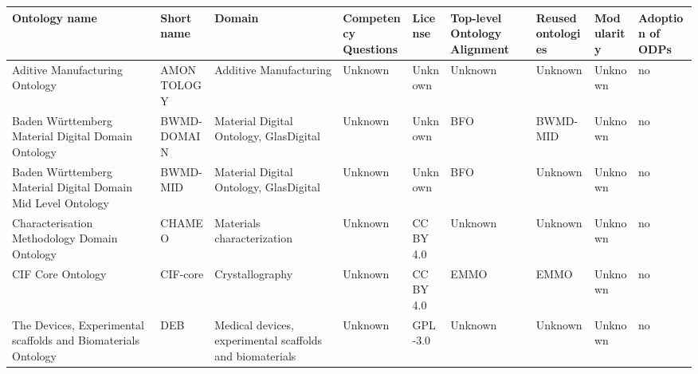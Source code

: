 \begin{tabular}{m{5cm}m{2cm}m{5cm}m{2cm}m{2cm}m{2cm}m{2cm}m{2cm}m{2cm}}
\toprule
                                                                    Ontology name &              Short name &                                                                            Domain & Competency Questions &      License & Top-level Ontology Alignment & Reused ontologies & Modularity & Adoption of ODPs \\
\midrule
                                                   Aditive Manufacturing Ontology &              AMONTOLOGY &                                                            Additive Manufacturing &              Unknown &      Unknown &                      Unknown &           Unknown &    Unknown &               no \\
            Baden Württemberg Material Digital Domain Ontology \cite{bwmd_review} &             BWMD-DOMAIN &                                            Material Digital Ontology, GlasDigital &              Unknown &      Unknown &                          BFO &          BWMD-MID &    Unknown &               no \\
  Baden Württemberg Material Digital Domain Mid Level Ontology \cite{bwmd_review} &                BWMD-MID &                                            Material Digital Ontology, GlasDigital &              Unknown &      Unknown &                          BFO &           Unknown &    Unknown &               no \\
                       Characterisation Methodology Domain Ontology \cite{CHAMEO} &                  CHAMEO &                                                        Materials characterization &              Unknown &    CC BY 4.0 &                      Unknown &           Unknown &    Unknown &               no \\
                                                                CIF Core Ontology &                CIF-core &                                                                   Crystallography &              Unknown &    CC BY 4.0 &                         EMMO &              EMMO &    Unknown &               no \\
The Devices, Experimental scaffolds and Biomaterials Ontology \cite{deb_ontology} &                     DEB &                          Medical devices, experimental scaffolds and biomaterials &              Unknown &    GPL-3.0   &                      Unknown &           Unknown &    Unknown &               no \\

\end{tabular}
